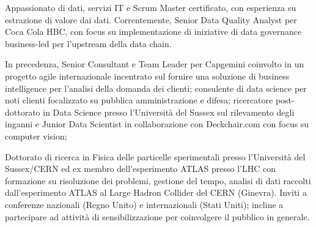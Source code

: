 
Appassionato di dati, servizi IT e Scrum Master certificato, con esperienza su estrazione di valore dai dati.
Correntemente, Senior Data Quality Analyst per Coca Cola HBC, con focus su implementazione di iniziative di data governance business-led per l'upstream della data chain.

In precedenza, Senior Consultant e Team Leader per Capgemini coinvolto in un progetto agile internazionale incentrato sul fornire una soluzione di business intelligence per l'analisi della domanda dei clienti; consulente di data science per noti clienti focalizzato su pubblica amministrazione e difesa; ricercatore post-dottorato in Data Science presso l'Università del Sussex sul rilevamento degli inganni e Junior Data Scientist in collaborazione con Deckchair.com con focus su computer vision;

Dottorato di ricerca in Fisica delle particelle sperimentali presso l'Università del Sussex/CERN ed ex membro dell'esperimento ATLAS presso l'LHC con formazione su risoluzione dei problemi, gestione del tempo, analisi di dati raccolti dall'esperimento ATLAS al Large Hadron Collider del CERN (Ginevra). Inviti a conferenze nazionali (Regno Unito) e internazionali (Stati Uniti); incline a partecipare ad attività di sensibilizzazione per coinvolgere il pubblico in generale.